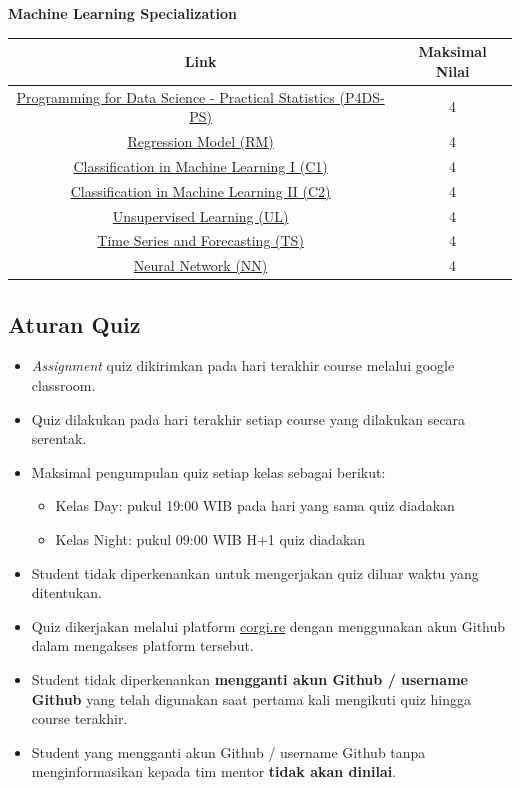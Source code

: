 \documentclass[
]{book}
\providecommand{\tightlist}{%
  \setlength{\itemsep}{0pt}\setlength{\parskip}{0pt}}
\begin{document}
\textbf{Machine Learning Specialization}

\begin{longtable}[]{@{}cc@{}}
\toprule
\textbf{Link} & \textbf{Maksimal Nilai}\tabularnewline
\midrule
\endhead
\href{https://corgi.re/courses/Davidlimbong/P4DS-PS}{Programming for Data Science - Practical Statistics (P4DS-PS)} & 4\tabularnewline
\href{https://corgi.re/courses/ahmadhusain/regressionmodels}{Regression Model (RM)} & 4\tabularnewline
\href{https://corgi.re/courses/inytss/classification1}{Classification in Machine Learning I (C1)} & 4\tabularnewline
\href{https://corgi.re/courses/ysitta/Classification2}{Classification in Machine Learning II (C2)} & 4\tabularnewline
\href{https://corgi.re/courses/Davidlimbong/UnsupervisedLearning}{Unsupervised Learning (UL)} & 4\tabularnewline
\href{https://corgi.re/courses/inytss/time-series}{Time Series and Forecasting (TS)} & 4\tabularnewline
\href{https://corgi.re/courses/ysitta/Neural_Network}{Neural Network (NN)} & 4\tabularnewline
\bottomrule
\end{longtable}

\hypertarget{aturan-quiz}{%
\subsection{Aturan Quiz}\label{aturan-quiz}}

\begin{itemize}
\item
  \emph{Assignment} quiz dikirimkan pada hari terakhir course melalui google classroom.
\item
  Quiz dilakukan pada hari terakhir setiap course yang dilakukan secara serentak.
\item
  Maksimal pengumpulan quiz setiap kelas sebagai berikut:

  \begin{itemize}
  \tightlist
  \item
    Kelas Day: pukul 19:00 WIB pada hari yang sama quiz diadakan
  \item
    Kelas Night: pukul 09:00 WIB H+1 quiz diadakan
  \end{itemize}
\item
  Student tidak diperkenankan untuk mengerjakan quiz diluar waktu yang ditentukan.
\item
  Quiz dikerjakan melalui platform \href{https://corgi.re}{corgi.re} dengan menggunakan akun Github dalam mengakses platform tersebut.
\item
  Student tidak diperkenankan \textbf{mengganti akun Github / username Github} yang telah digunakan saat pertama kali mengikuti quiz hingga course terakhir.
\item
  Student yang mengganti akun Github / username Github tanpa menginformasikan kepada tim mentor \textbf{tidak akan dinilai}.
\end{itemize}
\end{document}
